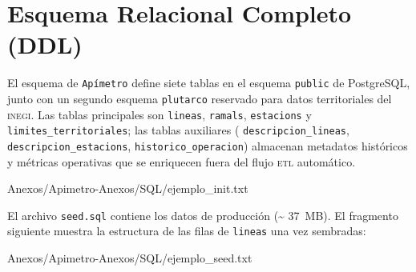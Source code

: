
\section{Esquema Relacional Completo (DDL)}
\label{anx:apimetro-sql}

El esquema de \texttt{Apímetro} define siete tablas en el esquema
\texttt{public} de PostgreSQL, junto con un segundo esquema \texttt{plutarco}
reservado para datos territoriales del \textsc{inegi}. Las tablas principales
son \texttt{lineas}, \texttt{ramals}, \texttt{estacions} y
\texttt{limites\_territoriales}; las tablas auxiliares (
\texttt{descripcion\_lineas}, \texttt{descripcion\_estacions},
\texttt{historico\_operacion}) almacenan metadatos históricos y métricas
operativas que se enriquecen fuera del flujo \textsc{etl} automático.

 {Anexos/Apimetro-Anexos/SQL/ejemplo_init.txt}

El archivo \texttt{seed.sql} contiene los datos de producción (\textasciitilde
37~MB). El fragmento siguiente muestra la estructura de las filas de
\texttt{lineas} una vez sembradas:

 {Anexos/Apimetro-Anexos/SQL/ejemplo_seed.txt}
